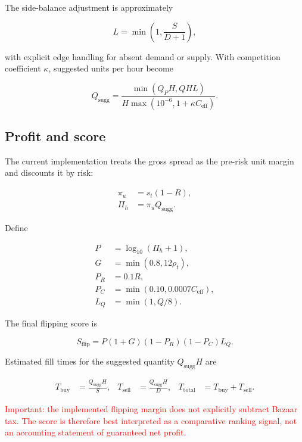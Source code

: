 \documentclass[11pt,a4paper]{article}
\newcommand{\risk}[1]{\textcolor{red}{#1}}
\begin{document}
The side-balance adjustment is approximately

\begin{equation}
L=\min\left(1,\frac{S}{D+1}\right),
\end{equation}

with explicit edge handling for absent demand or supply. With competition coefficient
$\kappa$, suggested units per hour become

\begin{equation}
Q_{\mathrm{sugg}}=
\frac{\min(Q_PH,QHL)}{H\max(10^{-6},1+\kappa C_{\mathrm{eff}})}.
\end{equation}

\subsection{Profit and score}

The current implementation treats the gross spread as the pre-risk unit margin and discounts
it by risk:

\begin{align}
\pi_u &= s_t(1-R),\\
\Pi_h &= \pi_u Q_{\mathrm{sugg}}.
\end{align}

Define

\begin{align}
P &= \log_{10}(\Pi_h+1),\\
G &= \min(0.8,12\rho_t),\\
P_R &= 0.1R,\\
P_C &= \min(0.10,0.0007C_{\mathrm{eff}}),\\
L_Q &= \min(1,Q/8).
\end{align}

The final flipping score is

\begin{equation}
\boxed{S_{\mathrm{flip}}=P(1+G)(1-P_R)(1-P_C)L_Q.}
\end{equation}

Estimated fill times for the suggested quantity $Q_{\mathrm{sugg}}H$ are

\begin{align}
T_{\mathrm{buy}}&=\frac{Q_{\mathrm{sugg}}H}{S},&
T_{\mathrm{sell}}&=\frac{Q_{\mathrm{sugg}}H}{D},&
T_{\mathrm{total}}&=T_{\mathrm{buy}}+T_{\mathrm{sell}}.
\end{align}

\risk{Important: the implemented flipping margin does not explicitly subtract Bazaar tax.
The score is therefore best interpreted as a comparative ranking signal, not an accounting
statement of guaranteed net profit.}
\end{document}
